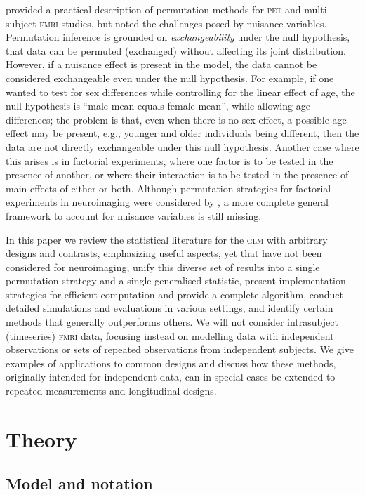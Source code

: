 \citet{Nichols2002} provided a practical description of permutation methods for \textsc{pet} and multi-subject \textsc{fmri} studies, but noted the challenges posed by nuisance variables. Permutation inference is grounded on \emph{exchangeability} under the null hypothesis, that data can be permuted (exchanged) without affecting its joint distribution. However, if a nuisance effect is present in the model, the data cannot be considered exchangeable even under the null hypothesis.  For example, if one wanted to test for sex differences while controlling for the linear effect of age, the null hypothesis is ``male mean equals female mean'', while allowing age differences; the problem is that, even when there is no sex effect, a possible age effect may be present, e.g., younger and older individuals being different, then the data are not directly exchangeable under this null hypothesis. Another case where this arises is in factorial experiments, where one factor is to be tested in the presence of another, or where their interaction is to be tested in the presence of main effects of either or both. Although permutation strategies for factorial experiments in neuroimaging were considered by \citet{Suckling2004}, a more complete general framework to account for nuisance variables is still missing.

In this paper we review the statistical literature for the \textsc{glm} with arbitrary designs and contrasts, emphasizing useful aspects, yet that have not been considered for neuroimaging, unify this diverse set of results into a single permutation strategy and a single generalised statistic, present implementation strategies for efficient computation and provide a complete algorithm, conduct detailed simulations and evaluations in various settings, and identify certain methods that generally outperforms others. We will not consider intrasubject (timeseries) \textsc{fmri} data, focusing instead on modelling data with independent observations or sets of repeated observations from independent subjects. We give examples of applications to common designs and discuss how these methods, originally intended for independent data, can in special cases be extended to repeated measurements and longitudinal designs.

\section{Theory}

\subsection{Model and notation}
\label{sec:perm:model}

